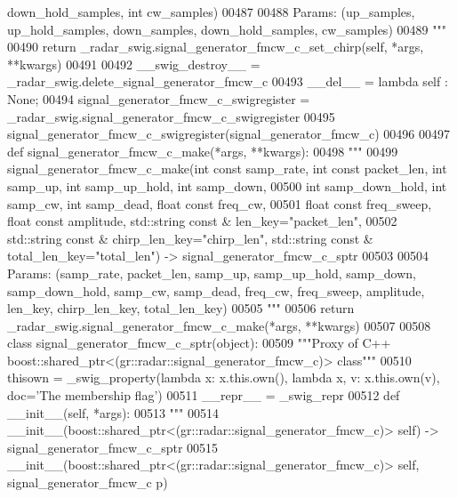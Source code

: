 \begin{DoxyCode}
{{{{{       down\_hold\_samples, int cw\_samples)}
00487 \textcolor{stringliteral}{}
00488 \textcolor{stringliteral}{        Params: (up\_samples, up\_hold\_samples, down\_samples, down\_hold\_samples, cw\_samples)}
00489 \textcolor{stringliteral}{        """}
00490         \textcolor{keywordflow}{return} \_radar\_swig.signal\_generator\_fmcw\_c\_set\_chirp(self, *args, **kwargs)
00491 
00492     \_\_swig\_destroy\_\_ = \_radar\_swig.delete\_signal\_generator\_fmcw\_c
00493     \_\_del\_\_ = \textcolor{keyword}{lambda} self : \textcolor{keywordtype}{None};
00494 signal\_generator\_fmcw\_c\_swigregister = \_radar\_swig.signal\_generator\_fmcw\_c\_swigregister
00495 signal_generator_fmcw_c_swigregister(signal\_generator\_fmcw\_c)
00496 
00497 \textcolor{keyword}{def }signal_generator_fmcw_c_make(*args, **kwargs):
00498   \textcolor{stringliteral}{"""}
00499 \textcolor{stringliteral}{    signal\_generator\_fmcw\_c\_make(int const samp\_rate, int const packet\_len, int samp\_up, int samp\_up\_hold,
       int samp\_down, }
00500 \textcolor{stringliteral}{        int samp\_down\_hold, int samp\_cw, int samp\_dead, float const freq\_cw, }
00501 \textcolor{stringliteral}{        float const freq\_sweep, float const amplitude, std::string const & len\_key="packet\_len", }
00502 \textcolor{stringliteral}{        std::string const & chirp\_len\_key="chirp\_len", std::string const & total\_len\_key="total\_len") ->
       signal\_generator\_fmcw\_c\_sptr}
00503 \textcolor{stringliteral}{}
00504 \textcolor{stringliteral}{    Params: (samp\_rate, packet\_len, samp\_up, samp\_up\_hold, samp\_down, samp\_down\_hold, samp\_cw, samp\_dead,
       freq\_cw, freq\_sweep, amplitude, len\_key, chirp\_len\_key, total\_len\_key)}
00505 \textcolor{stringliteral}{    """}
00506   \textcolor{keywordflow}{return} \_radar\_swig.signal\_generator\_fmcw\_c\_make(*args, **kwargs)
00507 
00508 \textcolor{keyword}{class }signal_generator_fmcw_c_sptr(object):
00509     \textcolor{stringliteral}{"""Proxy of C++ boost::shared\_ptr<(gr::radar::signal\_generator\_fmcw\_c)> class"""}
00510     thisown = _swig_property(\textcolor{keyword}{lambda} x: x.this.own(), \textcolor{keyword}{lambda} x, v: x.this.own(v), doc=\textcolor{stringliteral}{'The membership flag'})
00511     \_\_repr\_\_ = \_swig\_repr
00512     \textcolor{keyword}{def }__init__(self, *args): 
00513         \textcolor{stringliteral}{"""}
00514 \textcolor{stringliteral}{        \_\_init\_\_(boost::shared\_ptr<(gr::radar::signal\_generator\_fmcw\_c)> self) ->
       signal\_generator\_fmcw\_c\_sptr}
00515 \textcolor{stringliteral}{        \_\_init\_\_(boost::shared\_ptr<(gr::radar::signal\_generator\_fmcw\_c)> self, signal\_generator\_fmcw\_c p)
}}}}}
\end{DoxyCode}
